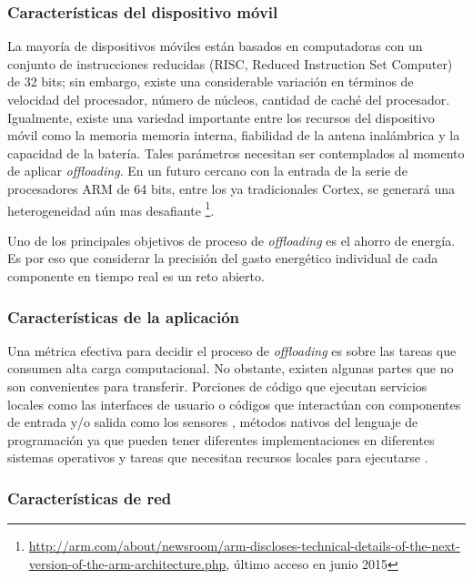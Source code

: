 \subsubsection{Características del dispositivo móvil}
 La mayoría de dispositivos móviles están basados en computadoras con un conjunto de instrucciones
 reducidas (RISC, Reduced Instruction Set Computer) de 32 bits; sin embargo, existe una considerable variación en términos de velocidad
 del procesador,
 número de núcleos, cantidad de caché del procesador. Igualmente, existe una variedad importante entre los recursos del dispositivo móvil como
 la memoria memoria interna, fiabilidad de la antena inalámbrica y la capacidad de la batería. Tales parámetros necesitan ser contemplados 
 al momento de aplicar \emph{offloading}. En un futuro cercano con la entrada de la serie de procesadores ARM de 64 bits, entre los ya 
 tradicionales Cortex, se generará una heterogeneidad aún mas desafiante \footnote{\tiny \url{http://arm.com/about/newsroom/arm-discloses-technical-details-of-the-next-version-of-the-arm-architecture.php},
 último acceso en junio 2015}.
 
 Uno de los principales objetivos de proceso de \emph{offloading} es el ahorro de energía. Es por eso que considerar la precisión del gasto
 energético  individual de cada componente en tiempo real es un reto abierto.  
 
 \subsubsection{Características de la aplicación}
 
 Una métrica efectiva para decidir el proceso de \emph{offloading} es sobre las tareas que consumen alta carga computacional.
 No obstante, existen 
 algunas partes que no son convenientes para transferir. Porciones de código que ejecutan servicios locales como las interfaces de usuario o
 códigos que interactúan con componentes de entrada y/o salida como los sensores \cite{Cuervo:2010:MMS:1814433.1814441}, 
 métodos nativos del lenguaje de programación ya que pueden tener diferentes implementaciones en diferentes sistemas
 operativos \cite{gu2004adaptive} \cite{gordon2012comet} y tareas que necesitan recursos locales para ejecutarse
 \cite{Othman:1998:PCS:584007.584011}. 

\subsubsection{Características de red} 
 
